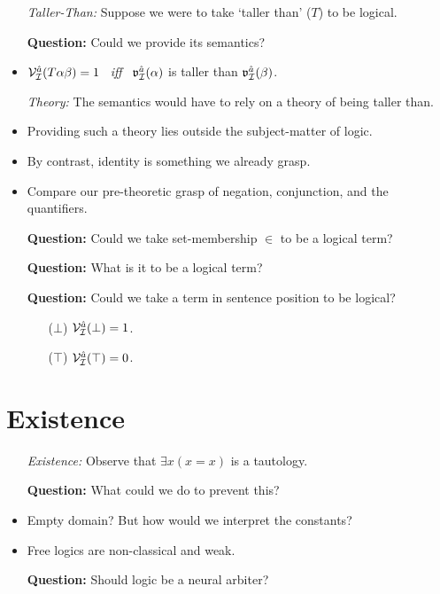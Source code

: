 \documentclass[a4paper, 11pt]{article} %
\begin{document}
\begin{itemize}
  \item[\it Taller-Than:] Suppose we were to take `taller than' ($T$) to be logical.
  \item[\bf Question:] Could we provide its semantics?
    \item $\mathcal{V}_{\mathcal{I}}^{\hat{a}}(T\alpha\beta)=1$ ~\textit{iff}~ $\mathfrak{v}_{\mathcal{I}}^{\hat{a}}(\alpha)$ is taller than $\mathfrak{v}_{\mathcal{I}}^{\hat{a}}(\beta)$.
  \item[\it Theory:] The semantics would have to rely on a theory of being taller than.
    \item Providing such a theory lies outside the subject-matter of logic.
    \item By contrast, identity is something we already grasp.
    \item Compare our pre-theoretic grasp of negation, conjunction, and the quantifiers.
  \item[\bf Question:] Could we take set-membership $\in$ to be a logical term? 
  \item[\bf Question:] What is it to be a logical term?
  \item[\bf Question:] Could we take a term in sentence position to be logical?
    \begin{itemize}
        \item[($\bot$)] $\mathcal{V}_{\mathcal{I}}^{\hat{a}}(\bot)=1$.
        \item[($\top$)] $\mathcal{V}_{\mathcal{I}}^{\hat{a}}(\top)=0$.
    \end{itemize}
\end{itemize}




\section*{Existence}%
  \label{sec:Existence}
  
\begin{itemize}
  \item[\it Existence:] Observe that $\exists x(x=x)$ is a tautology. 
  \item[\bf Question:] What could we do to prevent this?
  \item Empty domain? But how would we interpret the constants?
  \item Free logics are non-classical and weak.
  \item[\bf Question:] Should logic be a neural arbiter?
\end{itemize}
\end{document}
